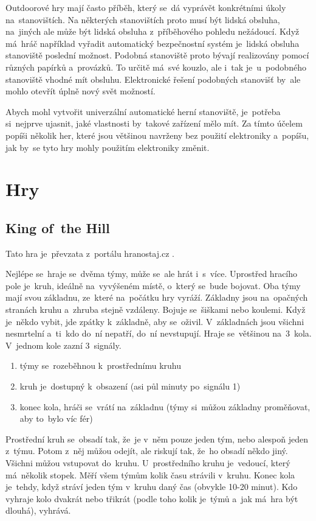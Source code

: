 Outdoorové hry mají často příběh, který se~dá vyprávět konkrétními úkoly na~stanovištích.
Na některých stanovištích proto musí být lidská obsluha, na~jiných ale může být lidská obsluha z~příběhového pohledu nežádoucí.
Když má~hráč například vyřadit automatický bezpečnostní systém je~lidská obsluha stanoviště poslední možnost.
Podobná stanoviště proto bývají realizovány pomocí různých papírků a~provázků.
To určitě má~své kouzlo, ale i~tak je~u~podobného stanoviště vhodné mít obsluhu.
Elektronické řešení podobných stanovišť by~ale mohlo otevřít úplně nový svět možností.

Abych mohl vytvořit univerzální automatické herní stanoviště, je~potřeba si~nejprve ujasnit, jaké vlastnosti by~takové zařízení mělo mít.
Za tímto účelem popíši několik her, které jsou většinou navrženy bez použití elektroniky a~popíšu, jak by~se tyto hry mohly použitím elektroniky změnit.

\vspace{-3mm}
\section{Hry}
\vspace{-2mm}
\subsection{King of~the Hill \label{KOTH} }
Tato hra je~převzata z~portálu hranostaj.cz \cite{KingOfTheHill}.

Nejlépe se~hraje se~dvěma týmy, může se~ale hrát i~s~více. 
Uprostřed hracího pole je~kruh, ideálně na~vyvýšeném místě, o~který se~bude bojovat. 
Oba týmy mají svou základnu, ze~které na~počátku hry vyráží.
Základny jsou na~opačných stranách kruhu a~zhruba stejně vzdáleny.
Bojuje se~šiškami nebo koulemi. 
Když je~někdo vybit, jde zpátky k~základně, aby se~oživil. 
V~základnách jsou všichni nesmrtelní a~ti~kdo do~ní nepatří, do~ní nevstupují.
Hraje se~většinou na~3~kola. 
V~jednom kole zazní 3~signály.\\
\begin{enumerate}
    \item týmy se~rozeběhnou k~prostřednímu kruhu
    \item kruh je~dostupný k~obsazení (asi půl minuty po~signálu 1)
    \item konec kola, hráči se~vrátí na~základnu (týmy si~můžou základny proměňovat, aby to~bylo víc fér)
\end{enumerate}
\vspace{5mm}
Prostřední kruh se~obsadí tak, že~je v~něm pouze jeden tým, nebo alespoň jeden z~týmu. 
Potom z~něj můžou odejít, ale riskují tak, že~ho obsadí někdo jiný. 
Všichni můžou vstupovat do~kruhu.
U~prostředního kruhu je~vedoucí, který má~několik stopek. 
Měří všem týmům kolik času strávili v~kruhu. 
Konec kola je~tehdy, když stráví jeden tým v~kruhu daný čas (obvykle 10-20 minut). 
Kdo vyhraje kolo dvakrát nebo třikrát (podle toho kolik je~týmů a~jak má~hra být dlouhá), vyhrává.

